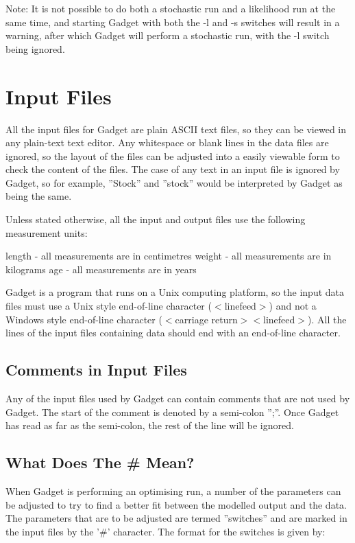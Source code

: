 \documentclass [a4paper, 10pt]{book}
\begin{document}
\bigskip
Note: It is not possible to do both a stochastic run and a likelihood run at the same time, and starting Gadget with both the -l and -s switches will result in a warning, after which Gadget will perform a stochastic run, with the -l switch being ignored.

\chapter{Input Files}\label{chap:input}
All the input files for Gadget are plain ASCII text files, so they can be viewed in any plain-text text editor.  Any whitespace or blank lines in the data files are ignored, so the layout of the files can be adjusted into a easily viewable form to check the content of the files.  The case of any text in an input file is ignored by Gadget, so for example, ''Stock'' and ''stock'' would be interpreted by Gadget as being the same.

\bigskip
Unless stated otherwise, all the input and output files use the following measurement units:\newline

length - all measurements are in centimetres\newline
weight - all measurements are in kilograms\newline
age - all measurements are in years

\bigskip
Gadget is a program that runs on a Unix computing platform, so the input data files must use a Unix style end-of-line character ($<$linefeed$>$) and not a Windows style end-of-line character ($<$carriage return$><$linefeed$>$).  All the lines of the input files containing data should end with an end-of-line character.

\section{Comments in Input Files}\label{sec:comments}
Any of the input files used by Gadget can contain comments that are not used by Gadget.  The start of the comment is denoted by a semi-colon '';''.  Once Gadget has read as far as the semi-colon, the rest of the line will be ignored.

\newpage
\section{What Does The \# Mean?}\label{sec:whatdoeshash}
When Gadget is performing an optimising run, a number of the parameters can be adjusted to try to find a better fit between the modelled output and the data.  The parameters that are to be adjusted are termed ''switches'' and are marked in the input files by the '\#' character.  The format for the switches is given by:
\end{document}
